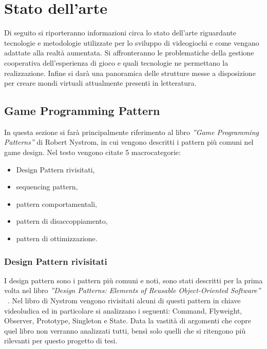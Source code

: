 \chapter{Stato dell'arte}\label{chap:Letteratura}
Di seguito si riporteranno informazioni circa lo stato dell'arte riguardante
tecnologie e metodologie utilizzate per lo sviluppo di videogiochi e come 
vengano adattate alla realtà aumentata. Si affronteranno le problematiche della 
gestione cooperativa dell'esperienza di gioco e quali tecnologie ne permettano 
la realizzazione. Infine si darà una panoramica delle strutture messe a 
disposizione per creare mondi virtuali attualmente presenti in letteratura.

\section{Game Programming Pattern}\label{sec:GameProgrammingPattern}
In questa sezione si farà principalmente riferimento al libro \textit{''Game Programming Patterns''}
di Robert Nystrom\cite{Nystrom2014}, in cui vengono descritti i pattern più comuni nel
game design. Nel testo vengono citate 5 macrocategorie:
\begin{itemize}
    \item Design Pattern rivisitati,
    \item sequencing pattern,
    \item pattern comportamentali,
    \item pattern di disaccoppiamento,
    \item pattern di ottimizzazione.
\end{itemize}

\subsection{Design Pattern rivisitati}\label{ssec:DesignPattern}
I design pattern sono i pattern più comuni e noti, sono stati descritti per la prima
volta nel libro \textit{''Design Patterns: Elements of Reusable Object-Oriented Software''}
~\cite{gangof4}. Nel libro di Nystrom vengono rivisitati alcuni di questi pattern
in chiave videoludica ed in particolare si analizzano i seguenti: Command, Flyweight,
Observer, Prototype, Singleton e State. Data la vastità di argomenti che copre quel libro
non verranno analizzati tutti, bensì solo quelli che si ritengono più rilevanti per
questo progetto di tesi.

